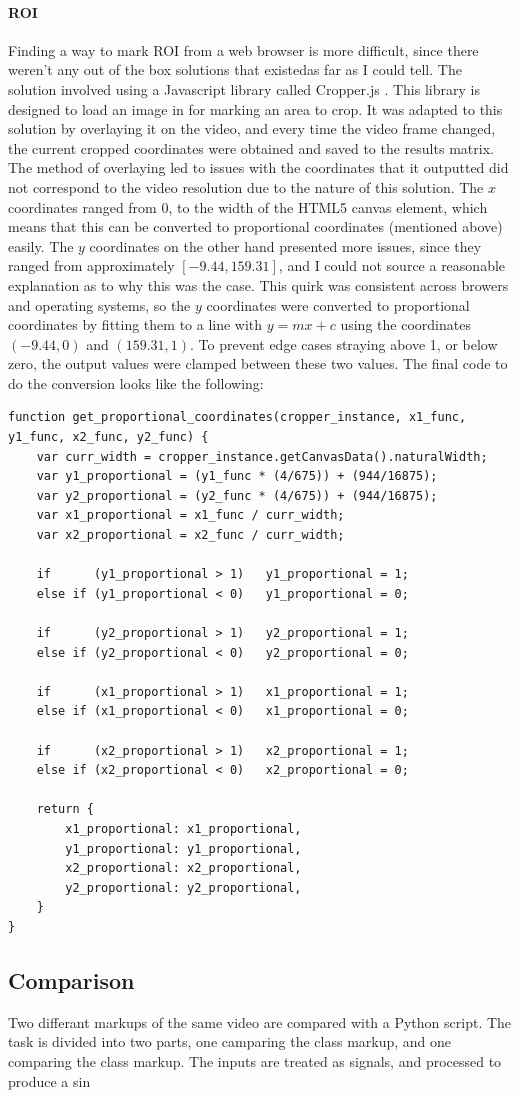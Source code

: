             \paragraph{ROI}
            Finding a way to mark ROI from a web browser is more difficult, since there weren't any out of the box solutions that existedas far as I could tell. The solution involved using a Javascript library called Cropper.js \cite{cropperjs}. This library is designed to load an image in for marking an area to crop. It was adapted to this solution by overlaying it on the video, and every time the video frame changed, the current cropped coordinates were obtained and saved to the results matrix. The method of overlaying led to issues with the coordinates that it outputted did not correspond to the video resolution due to the nature of this solution. The $x$ coordinates ranged from 0, to the width of the HTML5 canvas element, which means that this can be converted to proportional coordinates (mentioned above) easily. The $y$ coordinates on the other hand presented more issues, since they ranged from approximately $[-9.44, 159.31]$, and I could not source a reasonable explanation as to why this was the case. This quirk was consistent across browers and operating systems, so the $y$ coordinates were converted to proportional coordinates by fitting them to a line with $y=mx+c$ using the coordinates $(-9.44,0)$ and $(159.31,1)$. To prevent edge cases straying above 1, or below zero, the output values were clamped between these two values. The final code to do the conversion looks like the following:

            \begin{lstlisting}[style=JSStyle]
function get_proportional_coordinates(cropper_instance, x1_func, y1_func, x2_func, y2_func) {
    var curr_width = cropper_instance.getCanvasData().naturalWidth;
    var y1_proportional = (y1_func * (4/675)) + (944/16875);
    var y2_proportional = (y2_func * (4/675)) + (944/16875);
    var x1_proportional = x1_func / curr_width;
    var x2_proportional = x2_func / curr_width;

    if      (y1_proportional > 1)   y1_proportional = 1;
    else if (y1_proportional < 0)   y1_proportional = 0;

    if      (y2_proportional > 1)   y2_proportional = 1;
    else if (y2_proportional < 0)   y2_proportional = 0;

    if      (x1_proportional > 1)   x1_proportional = 1;
    else if (x1_proportional < 0)   x1_proportional = 0;

    if      (x2_proportional > 1)   x2_proportional = 1;
    else if (x2_proportional < 0)   x2_proportional = 0;
    
    return {
        x1_proportional: x1_proportional,
        y1_proportional: y1_proportional,
        x2_proportional: x2_proportional,
        y2_proportional: y2_proportional,
    }
}
    \end{lstlisting} 

    \subsection{Comparison}
    Two differant markups of the same video are compared with a Python script. The task is divided into two parts, one camparing the class markup, and one comparing the class markup. The inputs are treated as signals, and processed to produce a sin